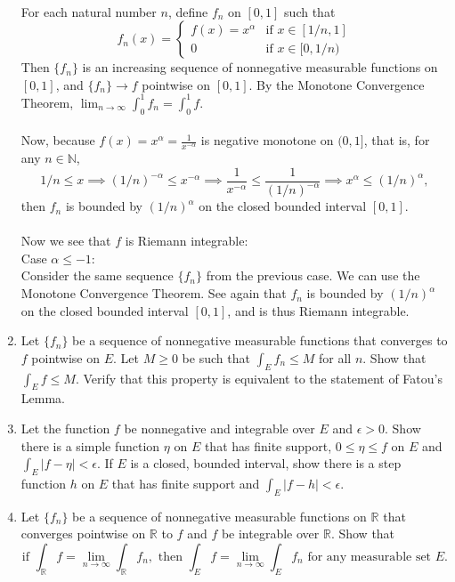\begin{enumerate}
    \\For each natural number $n$, define $f_n$ on $[0,1]$ such that
    \[
        f_n(x)=
        \begin{cases}
            f(x)=x^\alpha&\text{if }x\in[1/n,1]\\
            0&\text{if }x\in[0,1/n)
        \end{cases}
    \]
    Then $\{f_n\}$ is an increasing sequence of nonnegative measurable functions on $[0,1]$, and $\{f_n\}\to f$ pointwise on $[0,1]$.
    By the Monotone Convergence Theorem, $\lim_{n\to\infty}\int_0^1f_n=\int_0^1f$.\\
    \\Now,  because $f(x)=x^\alpha=\frac{1}{x^{-\alpha}}$ is negative monotone on $(0,1]$, that is, for any $n\in\mathbb{N}$,
    \[
        1/n\le x\implies (1/n)^{-\alpha}\le x^{-\alpha}\implies\frac{1}{x^{-\alpha}}\le\frac{1}{(1/n)^{-\alpha}}\implies x^\alpha\le(1/n)^\alpha,
    \] 
    then $f_n$ is bounded by $(1/n)^\alpha$ on the closed bounded interval $[0,1]$.\\
    \\Now we see that $f$ is Riemann integrable:
    \\Case $\alpha\le-1$:
    \\Consider the same sequence $\{f_n\}$ from the previous case. 
    We can use the Monotone Convergence Theorem.
    See again that $f_n$ is bounded by $(1/n)^\alpha$ on the closed bounded interval $[0,1]$, and is thus Riemann integrable.
    \item Let $\{f_n\}$ be a sequence of nonnegative measurable functions that converges to $f$ pointwise on $E$.
    Let $M\ge0$ be such that $\int_Ef_n\le M$ for all $n$. Show that $\int_Ef\le M$. Verify that this property is equivalent to the statement of Fatou's Lemma.
    \item Let the function $f$ be nonnegative and integrable over $E$ and $\epsilon>0$. Show there is a simple function $\eta$ on $E$ that has finite support, $0\le\eta\le f$ on $E$ and $\int_E|f-\eta|<\epsilon$.
    If $E$ is a closed, bounded interval, show there is a step function $h$ on $E$ that has finite support and $\int_E|f-h|<\epsilon$.
    \item Let $\{f_n\}$ be a sequence of nonnegative measurable functions on $\mathbb{R}$ that converges pointwise on $\mathbb{R}$ to $f$ and $f$ be integrable over $\mathbb{R}$. Show that
    \[
        \text{if }\int_{\mathbb{R}}f=\lim_{n\to\infty}\int_{\mathbb{R}}f_n,\text{ then }\int_Ef=\lim_{n\to\infty}\int_Ef_n\text{ for any measurable set }E.    
\]
\end{enumerate}
